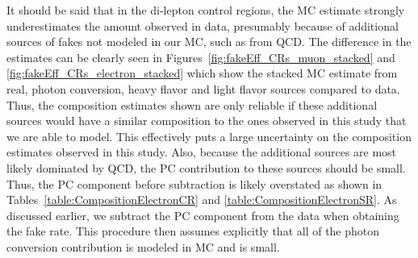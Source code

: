 It should be said that in the di-lepton control regions, 
the MC estimate strongly underestimates the amount observed
in data, presumably because of additional sources of fakes 
not modeled in our MC, such as from QCD. 
The difference in the estimates can be clearly seen in Figures~\ref{fig:fakeEff_CRs_muon_stacked}
and \ref{fig:fakeEff_CRs_electron_stacked} which show the stacked MC estimate from real, photon conversion,
heavy flavor and light flavor sources compared to data.
Thus, the composition estimates shown are only reliable 
if these additional sources would have a similar composition to the ones observed
in this study that we are able to model. This effectively 
puts a large uncertainty on the composition estimates observed in this study. Also,
because the additional sources are most likely dominated by QCD, the PC 
contribution to these sources should be small. Thus, the PC component before subtraction
is likely overstated as shown in 
Tables~\ref{table:CompositionElectronCR} 
and \ref{table:CompositionElectronSR}.
As discussed earlier, we subtract the PC
component from the data when obtaining the fake rate. This procedure then assumes
explicitly that all of the photon conversion contribution is modeled in MC and is 
small.


